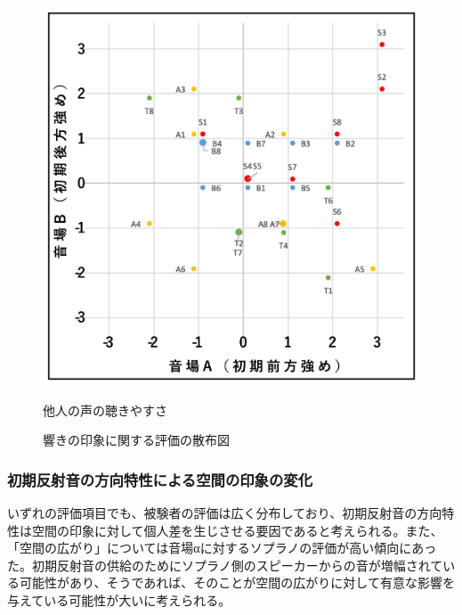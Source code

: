 \documentclass[11pt,a4j]{jreport}
\begin{document}
\begin{figure}[H]
  \begin{minipage}{1\linewidth}
    \centering
    \includegraphics[width=.45\linewidth]{images/subjectiveExp/scat_early_03othersVoice.png}
    \caption*{他人の声の聴きやすさ}
  \end{minipage}
  \caption{響きの印象に関する評価の散布図}
  \label{fig:響きの印象に関する評価の散布図}
\end{figure}

\newpage
\subsubsection*{初期反射音の方向特性による空間の印象の変化}
いずれの評価項目でも、被験者の評価は広く分布しており、初期反射音の方向特性は空間の印象に対して個人差を生じさせる要因であると考えられる。また、「空間の広がり」については音場αに対するソプラノの評価が高い傾向にあった。初期反射音の供給のためにソプラノ側のスピーカーからの音が増幅されている可能性があり、そうであれば、そのことが空間の広がりに対して有意な影響を与えている可能性が大いに考えられる。

\end{document}
